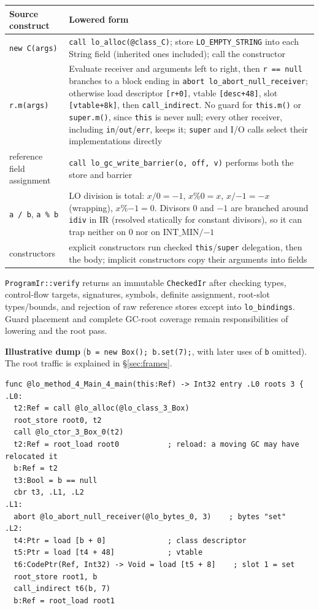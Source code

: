 \documentclass[10pt]{article}
\newcommand{\code}[1]{\texttt{\small #1}}
\begin{document}
\begin{center}\small
\begin{tabularx}{\linewidth}{@{}l X@{}}
\toprule
\textbf{Source construct} & \textbf{Lowered form} \\
\midrule
\code{new C(args)} & \code{call lo\_alloc(@class\_C)}; store \code{LO\_EMPTY\_STRING} into each String field (inherited ones included); call the constructor \\
\code{r.m(args)} & Evaluate receiver and arguments left to right, then \code{r == null} branches to a block ending in \code{abort lo\_abort\_null\_receiver}; otherwise load descriptor \code{[r+0]}, vtable \code{[desc+48]}, slot \code{[vtable+8k]}, then \code{call\_indirect}. No guard for \code{this.m()} or \code{super.m()}, since \code{this} is never null; every other receiver, including \code{in}/\code{out}/\code{err}, keeps it; \code{super} and I/O calls select their implementations directly \\
reference field assignment & \code{call lo\_gc\_write\_barrier(o, off, v)} performs both the store and barrier \\
\code{a / b}, \code{a \% b} & LO division is total: $x/0=-1$, $x\%0=x$, $x/{-1}=-x$ (wrapping), $x\%{-1}=0$. Divisors $0$ and $-1$ are branched around \code{idiv} in IR (resolved statically for constant divisors), so it can trap neither on $0$ nor on $\mathrm{INT\_MIN}/{-1}$ \\
constructors & explicit constructors run checked \code{this}/\code{super} delegation, then the body; implicit constructors copy their arguments into fields \\
\bottomrule
\end{tabularx}
\end{center}

\code{ProgramIr::verify} returns an immutable \code{CheckedIr} after checking types, control-flow targets, signatures, symbols, definite assignment, root-slot types/bounds, and rejection of raw reference stores except into \code{lo\_bindings}. Guard placement and complete GC-root coverage remain responsibilities of lowering and the root pass.

\textbf{Illustrative dump} (\code{b = new Box(); b.set(7);}, with later uses of \code{b} omitted). The root traffic is explained in \S\ref{sec:frames}.
\begin{lstlisting}
func @lo_method_4_Main_4_main(this:Ref) -> Int32 entry .L0 roots 3 {
.L0:
  t2:Ref = call @lo_alloc(@lo_class_3_Box)
  root_store root0, t2
  call @lo_ctor_3_Box_0(t2)
  t2:Ref = root_load root0           ; reload: a moving GC may have relocated it
  b:Ref = t2
  t3:Bool = b == null
  cbr t3, .L1, .L2
.L1:
  abort @lo_abort_null_receiver(@lo_bytes_0, 3)    ; bytes "set"
.L2:
  t4:Ptr = load [b + 0]              ; class descriptor
  t5:Ptr = load [t4 + 48]            ; vtable
  t6:CodePtr(Ref, Int32) -> Void = load [t5 + 8]    ; slot 1 = set
  root_store root1, b
  call_indirect t6(b, 7)
  b:Ref = root_load root1
\end{lstlisting}
\end{document}
